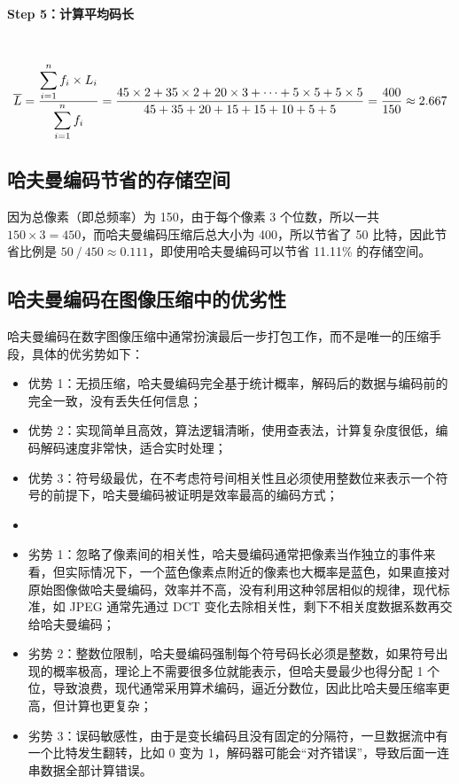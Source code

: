 \documentclass{article}
\newcommand{\barline}[1]{\overline{#1\rule{0pt}{1.5ex}}}
\begin{document}
\paragraph*{Step 5：计算平均码长}~{}
\[ \barline{L}=\dfrac{\displaystyle\sum_{i=1}^{n}f_i\times L_i}{\displaystyle\sum_{i=1}^{n}f_i}=\dfrac{45\times2+35\times2+20\times3+\cdots+5\times5+5\times5}{45+35+20+15+15+10+5+5}=\dfrac{400}{150}\approx2.667 \]



\subsection{哈夫曼编码节省的存储空间}
因为总像素（即总频率）为 150，由于每个像素 3 个位数，所以一共 $150\times3=450$，而哈夫曼编码压缩后总大小为 400，所以节省了 50 比特，因此节省比例是 $50\ /\ 450\approx0.111$，即使用哈夫曼编码可以节省 11.11\% 的存储空间。



\subsection{哈夫曼编码在图像压缩中的优劣性}
哈夫曼编码在数字图像压缩中通常扮演最后一步打包工作，而不是唯一的压缩手段，具体的优劣势如下：

\begin{itemize}
    \item 优势 1：无损压缩，哈夫曼编码完全基于统计概率，解码后的数据与编码前的完全一致，没有丢失任何信息；
    \item 优势 2：实现简单且高效，算法逻辑清晰，使用查表法，计算复杂度很低，编码解码速度非常快，适合实时处理；
    \item 优势 3：符号级最优，在不考虑符号间相关性且必须使用整数位来表示一个符号的前提下，哈夫曼编码被证明是效率最高的编码方式；
    \item[-]
    \item 劣势 1：忽略了像素间的相关性，哈夫曼编码通常把像素当作独立的事件来看，但实际情况下，一个蓝色像素点附近的像素也大概率是蓝色，如果直接对原始图像做哈夫曼编码，效率并不高，没有利用这种邻居相似的规律，现代标准，如 JPEG 通常先通过 DCT 变化去除相关性，剩下不相关度数据系数再交给哈夫曼编码；
    \item 劣势 2：整数位限制，哈夫曼编码强制每个符号码长必须是整数，如果符号出现的概率极高，理论上不需要很多位就能表示，但哈夫曼最少也得分配 1 个位，导致浪费，现代通常采用算术编码，逼近分数位，因此比哈夫曼压缩率更高，但计算也更复杂；
    \item 劣势 3：误码敏感性，由于是变长编码且没有固定的分隔符，一旦数据流中有一个比特发生翻转，比如 0 变为 1，解码器可能会“对齐错误”，导致后面一连串数据全部计算错误。
\end{itemize}
\end{document}

